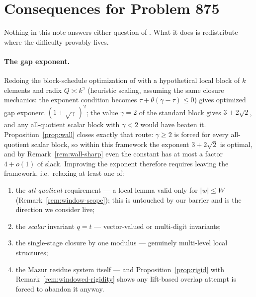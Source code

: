 \documentclass[11pt]{article}
\theoremstyle{definition}
\theoremstyle{remark}
\begin{document}
\section{Consequences for Problem 875}\label{sec:consequences}

Nothing in this note answers either question of \cite{EP875}. What it
does is redistribute where the difficulty provably lives.

\paragraph{The gap exponent.} Redoing the block-schedule optimization of
\cite[Remark~2]{Mazur26} with a hypothetical local block of $k$ elements
and radix $Q\asymp k^\gamma$ (heuristic scaling, assuming the same
closure mechanics: the exponent condition becomes
$\tau+\theta(\gamma-\tau)\le0$) gives optimized gap exponent
$(1+\sqrt\gamma\,)^2$; the value $\gamma=2$ of the standard block gives
$3+2\sqrt2$, and any all-quotient scalar block with $\gamma<2$ would have
beaten it. Proposition~\ref{prop:wall} closes exactly that route:
$\gamma\ge2$ is forced for every all-quotient scalar block, so within
this framework the exponent $3+2\sqrt2$ is optimal, and by
Remark~\ref{rem:wall-sharp} even the constant has at most a factor
$4+o(1)$ of slack. Improving the exponent therefore requires leaving the
framework, i.e.\ relaxing at least one of:
\begin{enumerate}
\item the \emph{all-quotient} requirement --- a local lemma valid only
for $|w|\le W$ (Remark~\ref{rem:window-scope}); this is untouched by our
barrier and is the direction we consider live;
\item the \emph{scalar} invariant $q=t$ --- vector-valued or multi-digit
invariants;
\item the single-stage closure by one modulus --- genuinely multi-level
local structures;
\item the Mazur residue system itself --- and Proposition~\ref{prop:rigid}
with Remark~\ref{rem:windowed-rigidity} shows any lift-based overlap
attempt is forced to abandon it anyway.
\end{enumerate}
\end{document}
